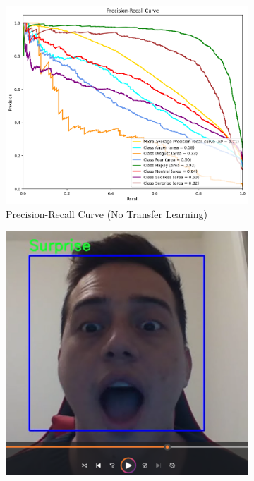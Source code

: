 \documentclass[conference]{IEEEtran}
\begin{document}
\begin{figure}[htbp]
\begin{subfigure}{0.22\textwidth}
        \includegraphics[width=\textwidth]{Figures/Precision-recall curve - no TL.png}
        \caption{Precision-Recall Curve (No Transfer Learning)}
        \label{fig:prec_recall_no_tl}
    \end{subfigure}
    \begin{subfigure}{0.22\textwidth}
        \includegraphics[width=\textwidth]{Figures/opencvsurprise.png}

\end{subfigure}
\end{figure}
\end{document}
